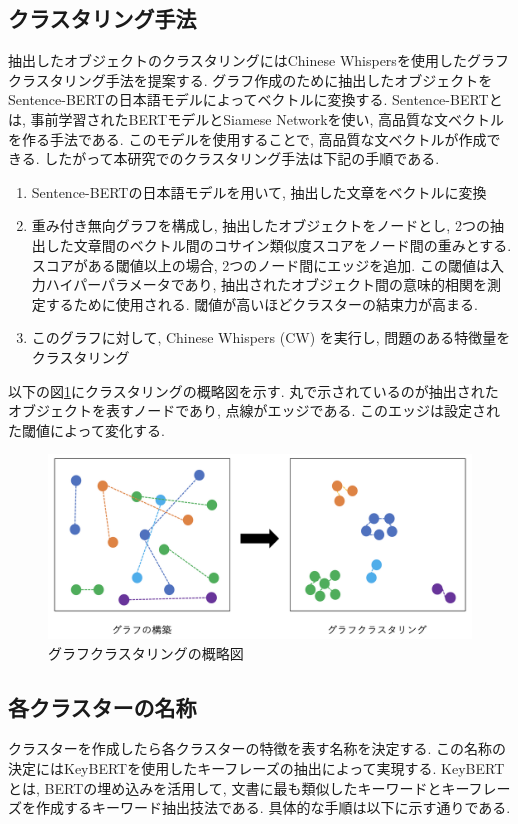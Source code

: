 \subsection{クラスタリング手法}
抽出したオブジェクトのクラスタリングにはChinese Whispers\cite{chinese-whispers}を使用したグラフクラスタリング手法を提案する. グラフ作成のために抽出したオブジェクトをSentence-BERTの日本語モデルによってベクトルに変換する. Sentence-BERT\cite{sentence-bert}とは, 事前学習されたBERTモデルとSiamese Networkを使い, 高品質な文ベクトルを作る手法である. このモデルを使用することで, 高品質な文ベクトルが作成できる. 
したがって本研究でのクラスタリング手法は下記の手順である. 
\begin{enumerate}
  \item Sentence-BERTの日本語モデルを用いて, 抽出した文章をベクトルに変換
  \item 重み付き無向グラフを構成し, 抽出したオブジェクトをノードとし, 2つの抽出した文章間のベクトル間のコサイン類似度スコアをノード間の重みとする. スコアがある閾値以上の場合, 2つのノード間にエッジを追加. この閾値は入力ハイパーパラメータであり, 抽出されたオブジェクト間の意味的相関を測定するために使用される. 閾値が高いほどクラスターの結束力が高まる. 
  \item このグラフに対して, Chinese Whispers (CW) を実行し, 問題のある特徴量をクラスタリング
\end{enumerate}

以下の図\ref{fig:clustering}にクラスタリングの概略図を示す. 丸で示されているのが抽出されたオブジェクトを表すノードであり, 点線がエッジである. このエッジは設定された閾値によって変化する. 
\begin{figure}[H]
  \centering
  \includegraphics[scale=0.4]
       {contents/images/clustering.png}
  \caption{グラフクラスタリングの概略図\label{fig:clustering}}
\end{figure}

\subsection{各クラスターの名称}
クラスターを作成したら各クラスターの特徴を表す名称を決定する. 
この名称の決定にはKeyBERT\cite{keybert}を使用したキーフレーズの抽出によって実現する. KeyBERTとは, BERTの埋め込みを活用して, 文書に最も類似したキーワードとキーフレーズを作成するキーワード抽出技法である. 
具体的な手順は以下に示す通りである. 

